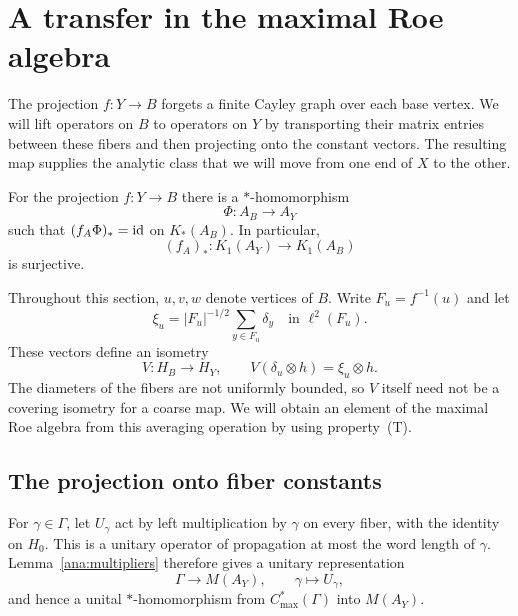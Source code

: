 \section{A transfer in the maximal Roe algebra}\label{sec:transfer}

The projection $f:Y\to B$ forgets a finite Cayley graph over each base
vertex.  We will lift operators on $B$ to operators on $Y$ by transporting
their matrix entries between these fibers and then projecting onto the
constant vectors.  The resulting map supplies the analytic class that we
will move from one end of $X$ to the other.

\begin{proposition}\label{ana:transfer}
For the projection $f:Y\to B$ there is a $*$-homomorphism
\[
 \Phi:A_B\longrightarrow A_Y
\]
such that $(f_A\Phi)_*=\operatorname{id}$ on $K_*(A_B)$.  In particular,
\[
 (f_A)_*:K_1(A_Y)\longrightarrow K_1(A_B)
\]
is surjective.
\end{proposition}

Throughout this section, $u,v,w$ denote vertices of $B$.  Write
$F_u=f^{-1}(u)$ and let
\[
 \xi_u=|F_u|^{-1/2}\sum_{y\in F_u}\delta_y
 \quad\text{in }\ell^2(F_u).
\]
These vectors define an isometry
\begin{equation}\label{eq:constant-isometry}
 V:H_B\longrightarrow H_Y,
 \qquad V(\delta_u\otimes h)=\xi_u\otimes h.
\end{equation}
The diameters of the fibers are not uniformly bounded, so $V$ itself need
not be a covering isometry for a coarse map.  We will obtain an element of
the maximal Roe algebra from this averaging operation by using
property~\textup{(T)}.

\subsection{The projection onto fiber constants}

For $\gamma\in\Gamma$, let $U_\gamma$ act by left multiplication by
$\gamma$ on every fiber, with the identity on $H_0$.  This is a unitary
operator of propagation at most the word length of $\gamma$.
Lemma~\ref{ana:multipliers} therefore gives a unitary representation
\[
 \Gamma\longrightarrow M(A_Y),\qquad\gamma\longmapsto U_\gamma,
\]
and hence a unital $*$-homomorphism from $C^*_{\max}(\Gamma)$ into
$M(A_Y)$.

